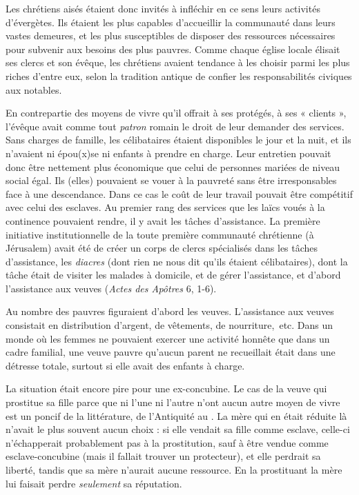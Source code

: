  Les chrétiens aisés étaient donc invités à infléchir en ce sens leurs activités d'évergètes. Ils étaient les plus capables d'accueillir la communauté dans leurs vastes demeures, et les plus susceptibles de disposer des ressources nécessaires pour subvenir aux besoins des plus pauvres. Comme chaque église locale élisait ses clercs et son évêque, les chrétiens avaient tendance à les choisir parmi les plus riches d'entre eux, selon la tradition antique de confier les responsabilités civiques aux notables. 

 En contrepartie des moyens de vivre qu'il offrait à ses protégés, à ses « clients », l'évêque avait comme tout \emph{patron} romain le droit de leur demander des services. Sans charges de famille, les célibataires étaient disponibles le jour et la nuit, et ils n'avaient ni épou(x)se ni enfants à prendre en charge. Leur entretien pouvait donc être nettement plus économique que celui de personnes mariées de niveau social égal. Ils (elles) pouvaient se vouer à la pauvreté sans être irresponsables face à une descendance. Dans ce cas le coût de leur travail pouvait être compétitif avec celui des esclaves. Au premier rang des services que les laïcs voués à la continence pouvaient rendre, il y avait les tâches d'assistance. La première initiative institutionnelle de la toute première communauté chrétienne (à Jérusalem) avait été de créer un corps de clercs spécialisés dans les tâches d'assistance, les \emph{diacres} (dont rien ne nous dit qu'ils étaient célibataires), dont la tâche était de visiter les malades à domicile, et de gérer l'assistance, et d'abord l'assistance aux veuves (\emph{Actes des Apôtres} 6, 1-6). 



Au nombre des pauvres figuraient d'abord les veuves. L'assistance aux veuves consistait en distribution d'argent, de vêtements, de nourriture,~etc. Dans un monde où les femmes ne pouvaient exercer une activité honnête que dans un cadre familial, une veuve pauvre qu'aucun parent ne recueillait était dans une détresse totale, surtout si elle avait des enfants à charge. 

 La situation était encore pire pour une ex-concubine. Le cas de la veuve qui prostitue sa fille parce que ni l'une ni l'autre n'ont aucun autre moyen de vivre est un poncif de la littérature, de l'Antiquité au . La mère qui en était réduite là n'avait le plus souvent aucun choix : si elle vendait sa fille comme esclave, celle-ci n'échapperait probablement pas à la prostitution, sauf à être vendue comme esclave-concubine (mais il fallait trouver un protecteur), et elle perdrait sa liberté, tandis que sa mère n'aurait aucune ressource. En la prostituant la mère lui faisait perdre \emph{seulement} sa réputation. 

